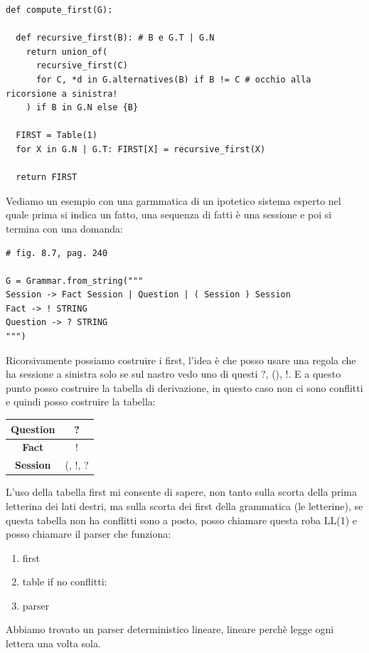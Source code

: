 \begin{lstlisting}
def compute_first(G):

  def recursive_first(B): # B e G.T | G.N
    return union_of(
      recursive_first(C)
      for C, *d in G.alternatives(B) if B != C # occhio alla ricorsione a sinistra!
    ) if B in G.N else {B}
  
  FIRST = Table(1)
  for X in G.N | G.T: FIRST[X] = recursive_first(X)
      
  return FIRST
\end{lstlisting}

Vediamo un esempio con una garmmatica di un ipotetico sistema esperto nel quale prima si indica un fatto, una sequenza di fatti è una sessione e poi si termina con una domanda:
\begin{lstlisting}
# fig. 8.7, pag. 240

G = Grammar.from_string("""
Session -> Fact Session | Question | ( Session ) Session
Fact -> ! STRING
Question -> ? STRING
""")
\end{lstlisting}

Ricorsivamente possiamo costruire i first, l'idea è che posso usare una regola che ha sessione a sinistra solo se sul nastro vedo uno di questi ?, (), !.
E a questo punto posso costruire la tabella di derivazione, in questo caso non ci sono conflitti e quindi posso costruire la tabella:
\begin{table}[ht!]
 \centering
  \begin{tabular}{|c|c|}
    \hline
    \textbf{Question} & ? \\ \hline
    \textbf{Fact} & ! \\ \hline
    \textbf{Session} & (, !, ? \\ \hline
    \end{tabular} 
\end{table}


L'uso della tabella first mi consente di sapere, non tanto sulla scorta della prima letterina dei lati destri, ma sulla scorta dei first della grammatica (le letterine), se questa tabella non ha conflitti sono a posto, posso chiamare questa roba LL(1) e posso chiamare il parser che funziona:
\begin{enumerate}
  \item first
  \item table if no conflitti:
  \item parser
\end{enumerate}

Abbiamo trovato un parser deterministico lineare, lineare perchè legge ogni lettera una volta sola.

